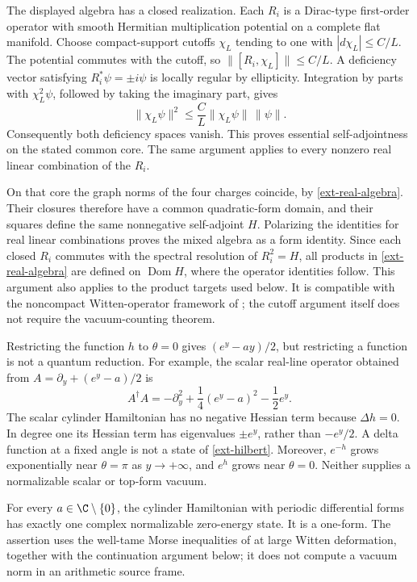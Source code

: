 The displayed algebra has a closed realization.  Each $R_i$ is a
Dirac-type first-order operator with smooth Hermitian multiplication
potential on a complete flat manifold.  Choose compact-support
cutoffs $\chi_L$ tending to one with $|d\chi_L|\leq C/L$.  The
potential commutes with the cutoff, so
$\|[R_i,\chi_L]\|\leq C/L$.  A deficiency vector satisfying
$R_i^*\psi=\pm i\psi$ is locally regular by ellipticity.  Integration
by parts with $\chi_L^2\psi$, followed by taking the imaginary part,
gives
\begin{equation}
 \|\chi_L\psi\|^2
 \leq \frac{C}{L}\|\chi_L\psi\|\,\|\psi\|.
 \label{ext-cutoff}
\end{equation}
Consequently both deficiency spaces vanish.  This proves essential
self-adjointness on the stated common core.  The same argument applies
to every nonzero real linear combination of the $R_i$.

On that core the graph norms of the four charges coincide, by
\eqref{ext-real-algebra}.  Their closures therefore have a common
quadratic-form domain, and their squares define the same nonnegative
self-adjoint $H$.  Polarizing the identities for real linear
combinations proves the mixed algebra as a form identity.  Since each
closed $R_i$ commutes with the spectral resolution of $R_i^2=H$, all
products in \eqref{ext-real-algebra} are defined on $\operatorname{Dom}H$,
where the operator identities follow.  This argument also applies to
the product targets used below.  It is compatible with the
noncompact Witten-operator framework of \cite{DaiYan}; the cutoff
argument itself does not require the vacuum-counting theorem.

Restricting the function $h$ to $\theta=0$ gives
$(e^y-ay)/2$, but restricting a function is not a quantum reduction.
For example, the scalar real-line operator obtained from
$A=\partial_y+(e^y-a)/2$ is
\begin{equation}
 A^\dagger A=-\partial_y^2+\frac14(e^y-a)^2-\frac12e^y.
 \label{ext-old-morse}
\end{equation}
The scalar cylinder Hamiltonian has no negative Hessian term because
$\Delta h=0$.  In degree one its Hessian term has eigenvalues
$\pm e^y$, rather than $-e^y/2$.  A delta function at a fixed angle
is not a state of \eqref{ext-hilbert}.  Moreover, $e^{-h}$ grows
exponentially near $\theta=\pi$ as $y\to+\infty$, and $e^h$ grows
near $\theta=0$.  Neither supplies a normalizable scalar or top-form
vacuum.

\begin{proposition}
\label{ext-vacuum-count}
For every $a\in\C\setminus\{0\}$, the cylinder Hamiltonian with
periodic differential forms has exactly one complex normalizable
zero-energy state.  It is a one-form.  The assertion uses the
well-tame Morse inequalities of \cite{DaiYan} at large Witten
deformation, together with the continuation argument below; it does
not compute a vacuum norm in an arithmetic source frame.
\end{proposition}

